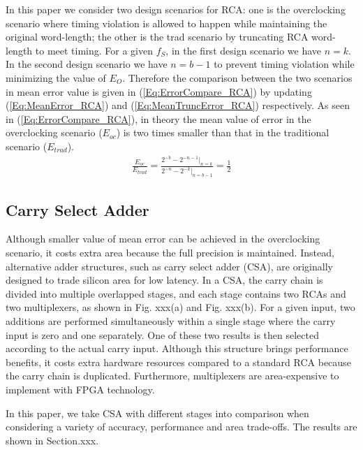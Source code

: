 \documentclass[10pt, conference, compsocconf]{IEEEtran}
\begin{document}
In this paper we consider two design scenarios for RCA: one is the overclocking scenario where timing violation is allowed to happen while maintaining the original word-length; the other is the trad scenario by truncating RCA word-length to meet timing. For a given $f_S$, in the first design scenario we have $n=k$. In the second design scenario we have $n=b-1$ to prevent timing violation while minimizing the value of $E_O$. Therefore the comparison between the two scenarios in mean error value is given in (\ref{Eq:ErrorCompare_RCA}) by updating (\ref{Eq:MeanError_RCA}) and (\ref{Eq:MeanTruncError_RCA}) respectively. As seen in (\ref{Eq:ErrorCompare_RCA}), in theory the mean value of error in the overclocking scenario ($E_{oc}$) is two times smaller than that in the traditional scenario ($E_{trad}$).
%
\begin{eqnarray}\label{Eq:ErrorCompare_RCA}
    \frac{E_{oc}}{E_{trad}} = \frac{2^{-b}-2^{-n-1}|_{n=k}}{2^{-n}-2^{-k}|_{n=b-1}}=\frac{1}{2}
\end{eqnarray}

\subsection{Carry Select Adder}
Although smaller value of mean error can be achieved in the overclocking scenario, it costs extra area because the full precision is maintained. Instead, alternative adder structures, such as carry select adder (CSA), are originally designed to trade silicon area for low latency. In a CSA, the carry chain is divided into multiple overlapped stages, and each stage contains two RCAs and two multiplexers, as shown in Fig. xxx(a) and Fig. xxx(b). For a given input, two additions are performed simultaneously within a single stage where the carry input is zero and one separately. One of these two results is then selected according to the actual carry input. Although this structure brings performance benefits, it costs extra hardware resources compared to a standard RCA because the carry chain is duplicated. Furthermore, multiplexers are area-expensive to implement with FPGA technology.

In this paper, we take CSA with different stages into comparison when considering a variety of accuracy, performance and area trade-offs. The results are shown in Section.xxx. 
\end{document}
